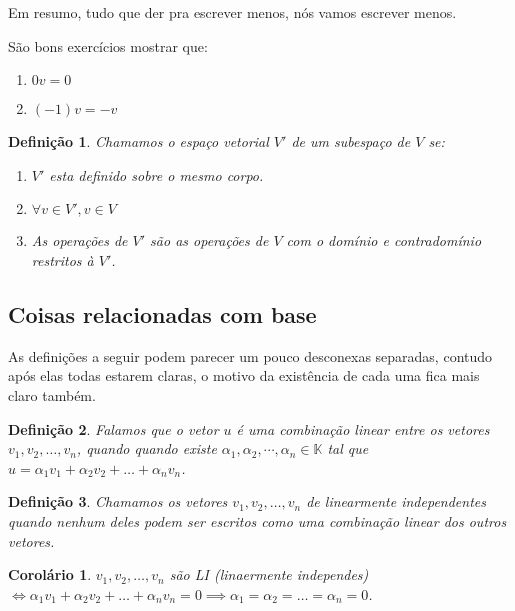\documentclass{article}
\newtheorem{corollary}[theorem]{Corolário}
\newtheorem{definition}{Definição}[section]
\newcommand{\KK}{\mathbb{K} }
\begin{document}
Em resumo, tudo que der pra escrever menos, nós vamos escrever menos.

São bons exercícios mostrar que:

\begin{enumerate}
    \item $0v=0$
    \item $(-1)v = -v$
\end{enumerate}

\begin{definition}

Chamamos o espaço vetorial $V'$ de um subespaço de $V$ se: 
\begin{enumerate}
    \item $V'$ esta definido sobre o mesmo corpo.
    \item $\forall v \in V', v \in V$
    \item As operações de $V'$ são as operações de $V$ com o domínio e contradomínio restritos à $V'$. 
    
%    
%    
\end{enumerate}
\end{definition}

\subsection{Coisas relacionadas com base}

As  definições a seguir podem parecer um pouco desconexas separadas, contudo após elas todas estarem claras, o motivo da existência de cada uma fica mais claro também.


\begin{definition}
Falamos que o vetor $u$  é uma combinação linear entre os vetores $v_1,v_2,\dots,v_n$, quando quando existe $\alpha_1, \alpha_2, \cdots , \alpha_n \in \KK$ tal que $u = \alpha_1v_1 + \alpha_2v_2 +\dots + \alpha_nv_n $.
\end{definition}

\begin{definition}
Chamamos os vetores $v_1,v_2, \dots, v_n$ de linearmente independentes quando nenhum deles podem ser escritos como uma combinação linear dos outros vetores.
\end{definition}

\begin{corollary}
$v_1,v_2, \dots, v_n$ são LI (linaermente independes) $\iff \alpha_1v_1 + \alpha_2v_2 +\dots + \alpha_nv_n = 0 \implies \alpha_1 = \alpha_2 = \dots = \alpha_n =0$.
\end{corollary}
\end{document}

